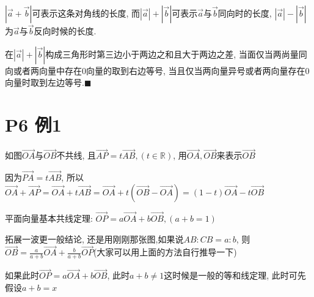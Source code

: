 \documentclass{book}
\begin{document}
$\displaystyle |\overrightarrow{a}+\overrightarrow{b}|$可表示这条对角线的长度, 而$|\overrightarrow{a}|+|\overrightarrow{b}|$可表示$\overrightarrow{a}$与$\overrightarrow{b}$同向时的长度, $|\overrightarrow{a}|-|\overrightarrow{b}|$为$\overrightarrow{a}$与$\overrightarrow{b}$反向时候的长度.

    在$|\overrightarrow{a}|+|\overrightarrow{b}|$构成三角形时\textcolor[rgb]{0.75,0.17,0.22}{第三边小于两边之和且大于两边之差}, 当面仅当两尚量同向或者两向量中存在0向量的取到右边等号, 当且仅当两向量异号或者两向量存在0向量时取到左边等号.$\blacksquare$

    \section{\textcolor[rgb]{0.11,0.65,0.52}{P6 例1}}

    如图$\overrightarrow{OA}$与$\overrightarrow{OB}$不共线, 且$\overrightarrow{AP}=t\overrightarrow{AB}, (t\in \mathbb{R})$, 用$\overrightarrow{OA},\overrightarrow{OB}$来表示$\overrightarrow{OB}$

    因为$\overrightarrow{PA}=t\overrightarrow{AB}$, 所以$\overrightarrow{OA}+\overrightarrow{AP}=\overrightarrow{OA}+t\overrightarrow{AB}=\overrightarrow{OA}+t(\overrightarrow{OB}-\overrightarrow{OA})=(1-t)\overrightarrow{OA}-t\overrightarrow{OB}$

    \textcolor[rgb]{0.38,0.11,0.2}{平面向量基本共线定理}: $\overrightarrow{OP}=a\overrightarrow{OA}+b\overrightarrow{OB},(a+b=1)$

    拓展一波更一般结论, 还是用刚刚那张图,如果说$AB:CB=a:b$, 则$\displaystyle \overrightarrow{OB}=\frac{a}{a+b}\overrightarrow{OA}+\frac{b}{a+b}\overrightarrow{OP}$(大家可以用上面的方法自行推导一下)

    如果此时$\overrightarrow{OP}=a\overrightarrow{OA}+b\overrightarrow{OB}$, 此时$a+b\neq 1$这时候是一般的\textcolor[rgb]{0.38,0.11,0.2}{等和线定理}, 此时可先假设$a+b=x$
\end{document}
